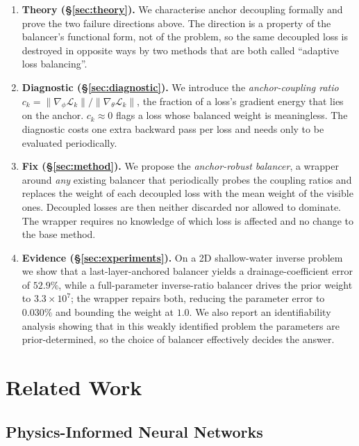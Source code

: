 \documentclass[a4paper,fleqn]{cas-sc}
\begin{document}
\begin{enumerate}
\item \textbf{Theory (\S\ref{sec:theory}).} We characterise anchor decoupling
formally and prove the two failure directions above. The direction is a
property of the balancer's functional form, not of the problem, so the same
decoupled loss is destroyed in opposite ways by two methods that are both
called ``adaptive loss balancing''.
\item \textbf{Diagnostic (\S\ref{sec:diagnostic}).} We introduce the
\emph{anchor-coupling ratio}
$c_k = \lVert\nabla_\phi \mathcal{L}_k\rVert /
\lVert\nabla_\theta \mathcal{L}_k\rVert$, the fraction of a loss's gradient
energy that lies on the anchor. $c_k \approx 0$ flags a loss whose balanced
weight is meaningless. The diagnostic costs one extra backward pass per loss
and needs only to be evaluated periodically.
\item \textbf{Fix (\S\ref{sec:method}).} We propose the
\emph{anchor-robust balancer}, a wrapper around \emph{any} existing balancer
that periodically probes the coupling ratios and replaces the weight of each
decoupled loss with the mean weight of the visible ones. Decoupled losses are
then neither discarded nor allowed to dominate. The wrapper requires no
knowledge of which loss is affected and no change to the base method.
\item \textbf{Evidence (\S\ref{sec:experiments}).} On a 2D shallow-water
inverse problem we show that a last-layer-anchored balancer yields a
drainage-coefficient error of $52.9\%$, while a full-parameter inverse-ratio
balancer drives the prior weight to $3.3\times10^7$; the wrapper repairs both,
reducing the parameter error to $0.030\%$ and bounding the weight at $1.0$.
We also report an identifiability analysis showing that in this weakly
identified problem the parameters are prior-determined, so the choice of
balancer effectively decides the answer.
\end{enumerate}

\section{Related Work}

\subsection{Physics-Informed Neural Networks}
\end{document}
